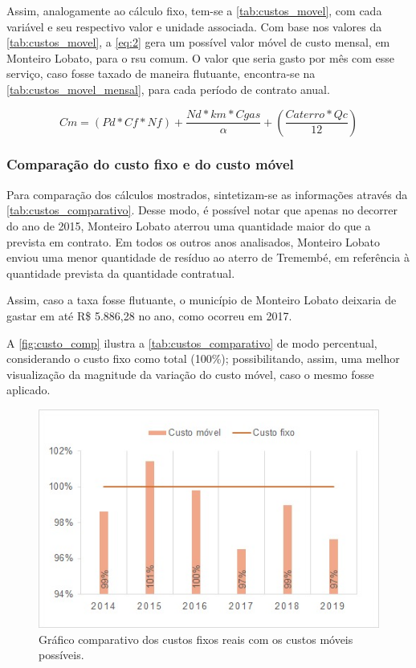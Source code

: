 	
	\FloatBarrier

Assim, analogamente ao cálculo fixo, tem-se a \autoref{tab:custos_movel}, com cada variável e seu respectivo valor e unidade associada. Com base nos valores da \autoref{tab:custos_movel}, a \autoref{eq:2} gera um possível valor móvel de custo mensal, em Monteiro Lobato, para o \gls{rsu} comum. O valor que seria gasto por mês com esse serviço, caso fosse taxado de maneira flutuante, encontra-se na \autoref{tab:custos_movel_mensal}, para cada período de contrato anual.

	
	
\begin{equation}
\label{eq:2}
Cm = (Pd*Cf*Nf)+\frac{Nd*km*Cgas}{\alpha}+(\frac{Caterro*Qc}{12})
\end{equation}

	

\subsubsection{Comparação do custo fixo e do custo móvel}
Para comparação dos cálculos mostrados, sintetizam-se as informações através da \autoref{tab:custos_comparativo}. Desse modo, é possível notar que apenas no decorrer do ano de 2015, Monteiro Lobato aterrou uma quantidade maior do que a prevista em contrato. Em todos os outros anos analisados, Monteiro Lobato enviou uma menor quantidade de resíduo ao aterro de Tremembé, em referência à quantidade prevista da quantidade contratual.

	

Assim, caso a taxa fosse flutuante, o município de Monteiro Lobato deixaria de gastar em até R\$ 5.886,28 no ano, como ocorreu em 2017.

A \autoref{fig:custo_comp} ilustra a \autoref{tab:custos_comparativo} de modo percentual, considerando o custo fixo como total (100\%); possibilitando, assim, uma melhor visualização da magnitude da variação do custo móvel, caso o mesmo fosse aplicado.

\begin{figure}
	\centering
	\includegraphics[width=0.7\linewidth]{produtos/prodquatro/custo_comp}
	\caption{Gráfico comparativo dos custos fixos reais com os custos móveis possíveis.}
	\label{fig:custo_comp}
\end{figure}
\FloatBarrier

